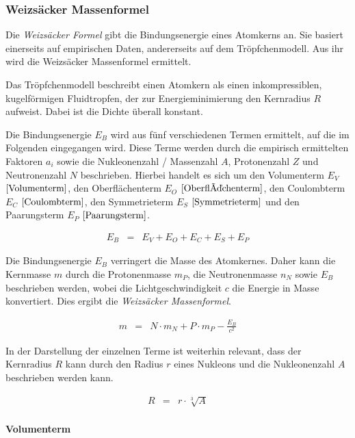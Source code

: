 \documentclass[12pt,a4paper]{scrartcl}
\numberwithin{equation}{section} %
\renewcommand{\[}{} %
\renewcommand{\]}{\noindent} %
\begin{document}
\hypertarget{weizsuxe4cker-massenformel}{%
\subsubsection{Weizsäcker
Massenformel}\label{weizsuxe4cker-massenformel}}

Die \emph{Weizsäcker Formel} gibt die Bindungsenergie eines Atomkerns
an. Sie basiert einerseits auf empirischen Daten, andererseits auf dem
Tröpfchenmodell. Aus ihr wird die Weizsäcker Massenformel ermittelt.

Das Tröpfchenmodell beschreibt einen Atomkern als einen inkompressiblen,
kugelförmigen Fluidtropfen, der zur Energieminimierung den Kernradius
\(R\) aufweist. Dabei ist die Dichte überall konstant.

Die Bindungsenergie \(E_B\) wird aus fünf verschiedenen Termen
ermittelt, auf die im Folgenden eingegangen wird. Diese Terme werden
durch die empirisch ermittelten Faktoren \(a_i\) sowie die Nukleonenzahl
/ Massenzahl \(A\), Protonenzahl \(Z\) und Neutronenzahl \(N\)
beschrieben. Hierbei handelt es sich um den Volumenterm \(E_V\)
\(\eqref{Volumenterm}\), den Oberflächenterm \(E_O\)
\(\eqref{Oberflächenterm}\), den Coulombterm \(E_C\)
\(\eqref{Coulombterm}\), den Symmetrieterm \(E_S\)
\(\eqref{Symmetrieterm}\) und den Paarungsterm \(E_P\)
\(\eqref{Paarungsterm}\).

\[
\begin{eqnarray}
    E_B &=& E_V + E_O + E_C + E_S + E_P
\end{eqnarray}
\]

Die Bindungsenergie \(E_B\) verringert die Masse des Atomkernes. Daher
kann die Kernmasse \(m\) durch die Protonenmasse \(m_P\), die
Neutronenmasse \(n_N\) sowie \(E_B\) beschrieben werden, wobei die
Lichtgeschwindigkeit \(c\) die Energie in Masse konvertiert. Dies ergibt
die \emph{Weizsäcker Massenformel}.

\[
\begin{eqnarray}
    m &=& N\cdot m_N + P\cdot m_P - \frac{E_B}{c^2}
\end{eqnarray}
\]

In der Darstellung der einzelnen Terme ist weiterhin relevant, dass der
Kernradius \(R\) kann durch den Radius \(r\) eines Nukleons und die
Nukleonenzahl \(A\) beschrieben werden kann.

\[
\begin{eqnarray}
    R &=& r \cdot \sqrt[3]{A}
\end{eqnarray}
\]

\hypertarget{volumenterm}{%
\paragraph{Volumenterm}\label{volumenterm}}
\end{document}
